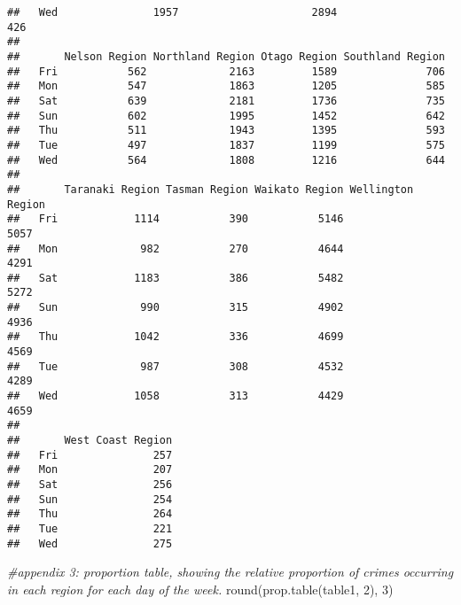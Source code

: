\documentclass[
  10pt,
]{article}
\newenvironment{Shaded}{\begin{snugshade}}{\end{snugshade}}
\newcommand{\CommentTok}[1]{\textcolor[rgb]{0.56,0.35,0.01}{\textit{#1}}}
\newcommand{\DecValTok}[1]{\textcolor[rgb]{0.00,0.00,0.81}{#1}}
\newcommand{\FunctionTok}[1]{\textcolor[rgb]{0.00,0.00,0.00}{#1}}
\newcommand{\NormalTok}[1]{#1}
\begin{document}
\begin{verbatim}
##   Wed               1957                     2894                426
##      
##       Nelson Region Northland Region Otago Region Southland Region
##   Fri           562             2163         1589              706
##   Mon           547             1863         1205              585
##   Sat           639             2181         1736              735
##   Sun           602             1995         1452              642
##   Thu           511             1943         1395              593
##   Tue           497             1837         1199              575
##   Wed           564             1808         1216              644
##      
##       Taranaki Region Tasman Region Waikato Region Wellington Region
##   Fri            1114           390           5146              5057
##   Mon             982           270           4644              4291
##   Sat            1183           386           5482              5272
##   Sun             990           315           4902              4936
##   Thu            1042           336           4699              4569
##   Tue             987           308           4532              4289
##   Wed            1058           313           4429              4659
##      
##       West Coast Region
##   Fri               257
##   Mon               207
##   Sat               256
##   Sun               254
##   Thu               264
##   Tue               221
##   Wed               275
\end{verbatim}

\begin{Shaded}
\begin{Highlighting}[]
\CommentTok{\#appendix 3: proportion table, showing the relative proportion of crimes occurring in each region for each day of the week. }
\FunctionTok{round}\NormalTok{(}\FunctionTok{prop.table}\NormalTok{(table1, }\DecValTok{2}\NormalTok{), }\DecValTok{3}\NormalTok{)}
\end{Highlighting}
\end{Shaded}
\end{document}
